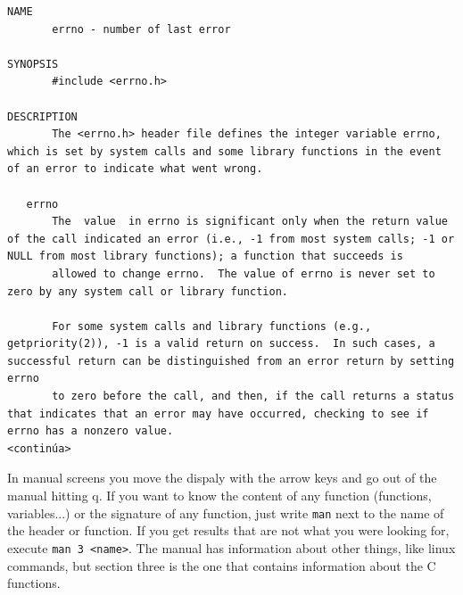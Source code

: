 \documentclass[a4paper]{article}
\begin{document}
\noindent
\begin{minipage}[H]{\linewidth}
\mbox{}
\begin{lstlisting}[style=terminalStyle]
NAME
       errno - number of last error

SYNOPSIS
       #include <errno.h>

DESCRIPTION
       The <errno.h> header file defines the integer variable errno, which is set by system calls and some library functions in the event of an error to indicate what went wrong.

   errno
       The  value  in errno is significant only when the return value of the call indicated an error (i.e., -1 from most system calls; -1 or NULL from most library functions); a function that succeeds is
       allowed to change errno.  The value of errno is never set to zero by any system call or library function.

       For some system calls and library functions (e.g., getpriority(2)), -1 is a valid return on success.  In such cases, a successful return can be distinguished from an error return by setting  errno
       to zero before the call, and then, if the call returns a status that indicates that an error may have occurred, checking to see if errno has a nonzero value.
<continúa>
\end{lstlisting}
\end{minipage}

In manual screens you move the dispaly with the arrow keys and go out of the
manual hitting q. If you want to know the content of any function (functions,
variables...) or the signature of any function, just write \verb!man! next to
the name of the header or function. If you get results that are not what you
were looking for, execute \verb!man 3 <name>!. The manual has information about
other things, like linux commands, but section three is the one that contains
information about the C functions.
\end{document}
